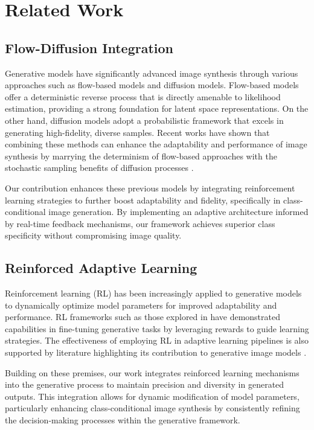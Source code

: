 \section{Related Work}

\subsection{Flow-Diffusion Integration}

Generative models have significantly advanced image synthesis through various approaches such as flow-based models and diffusion models. Flow-based models \cite{dinh2016density, kingma2018glow} offer a deterministic reverse process that is directly amenable to likelihood estimation, providing a strong foundation for latent space representations. On the other hand, diffusion models \cite{sohl2015deep, ho2020denoising} adopt a probabilistic framework that excels in generating high-fidelity, diverse samples. Recent works have shown that combining these methods can enhance the adaptability and performance of image synthesis by marrying the determinism of flow-based approaches with the stochastic sampling benefits of diffusion processes \cite{xia2021flow, luo2021diffusion}.

Our contribution enhances these previous models by integrating reinforcement learning strategies to further boost adaptability and fidelity, specifically in class-conditional image generation. By implementing an adaptive architecture informed by real-time feedback mechanisms, our framework achieves superior class specificity without compromising image quality.

\subsection{Reinforced Adaptive Learning}

Reinforcement learning (RL) has been increasingly applied to generative models to dynamically optimize model parameters for improved adaptability and performance. RL frameworks such as those explored in \cite{schulman2017proximal, lillicrap2015continuous} have demonstrated capabilities in fine-tuning generative tasks by leveraging rewards to guide learning strategies. The effectiveness of employing RL in adaptive learning pipelines is also supported by literature highlighting its contribution to generative image models \cite{caicedo2015active, ren2023reinforcement}.

Building on these premises, our work integrates reinforced learning mechanisms into the generative process to maintain precision and diversity in generated outputs. This integration allows for dynamic modification of model parameters, particularly enhancing class-conditional image synthesis by consistently refining the decision-making processes within the generative framework.

